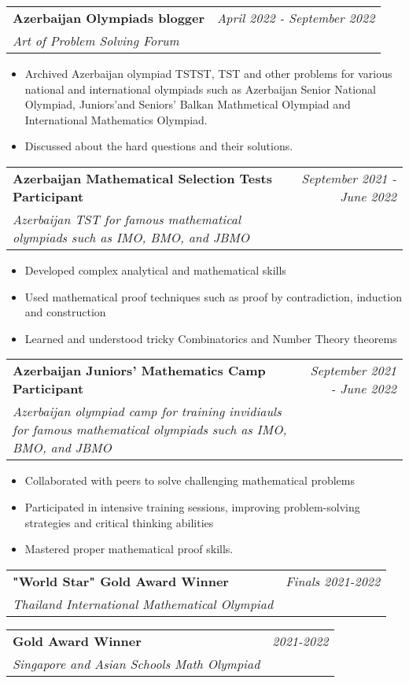 \documentclass[a4paper,11pt]{article}
\makeatletter
\newcommand{\resumeProject}[4]{
\vspace{0.5mm}\item
    \begin{tabular*}{0.98\textwidth}[t]{l@{\extracolsep{\fill}}r}
        \textbf{#1} & \textit{\footnotesize{#3}} \\
        \footnotesize{\textit{#2}} & \footnotesize{#4}
    \end{tabular*}
    \vspace{-2.4mm}
}
\newcommand{\resumeItemListStart}{\begin{itemize}[leftmargin=*,labelsep=1mm,itemsep=0.5mm]}
\newcommand{\resumeItemListEnd}{\end{itemize}\vspace{-2mm}}
\makeatother
\begin{document}
\resumeProject
  {Azerbaijan Olympiads blogger}
  {Art of Problem Solving Forum}
  {April 2022 - September 2022}
  {{}\href{https://artofproblemsolving.com/community/user/948405}{\textcolor{darkblue}{\faIcon{globe}}}}

\resumeItemListStart
  \item Archived Azerbaijan olympiad TSTST, TST and other problems for various national and international olympiads such as Azerbaijan Senior National Olympiad, Juniors'and Seniors' Balkan Mathmetical Olympiad and International Mathematics Olympiad.
  \item Discussed about the hard questions and their solutions.
\resumeItemListEnd




\resumeProject
  {Azerbaijan Mathematical Selection Tests Participant}
  {Azerbaijan TST for famous mathematical olympiads such as IMO, BMO, and JBMO}
  {September 2021 - June 2022}
  {}
\resumeItemListStart
  \item Developed complex analytical and mathematical skills
    \item Used mathematical proof techniques such as proof by contradiction, induction and construction
\item Learned and understood tricky Combinatorics and Number Theory theorems

\resumeItemListEnd

\resumeProject
  {Azerbaijan Juniors' Mathematics Camp Participant}
  {Azerbaijan olympiad camp for training invidiauls for famous mathematical olympiads such as IMO, BMO, and JBMO}
  {September 2021 - June 2022}
  {}
\resumeItemListStart
  \item Collaborated with peers to solve challenging mathematical problems
  \item Participated in intensive training sessions, improving problem-solving strategies and critical thinking abilities 
  \item Mastered proper mathematical proof skills.

\resumeItemListEnd

\resumeProject
  {"World Star" Gold Award Winner}
  {Thailand International Mathematical Olympiad}
  {Finals 2021-2022}
  {{}\href{http://www.thaiimo.com/uploads/2/8/9/2/28923219/timo_final_round_2122_s3.pdf}{\textcolor{darkblue}{\faIcon{globe}}}}


\resumeProject
  {Gold Award Winner}
  {Singapore  and Asian Schools Math Olympiad}
  {2021-2022}
  {{}\href{https://simccorg.sharepoint.com/:b:/s/SIMCCPublic/EdfiL57S9bpIojiuNb0vscQB_DwwfjQszeNSuPnKxdNfrg?e=H7m10g}{\textcolor{darkblue}{\faIcon{globe}}}}
\end{document}
